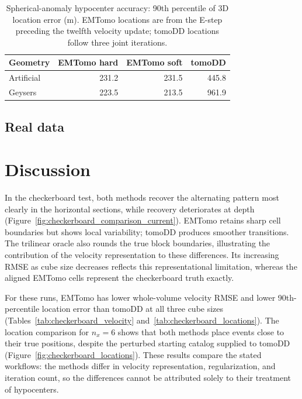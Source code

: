 \begin{table}[!htb]
\centering
\begin{singlespace}
\caption{Spherical-anomaly hypocenter accuracy: 90th percentile of 3D location error (m). EMTomo locations are from the E-step preceding the twelfth velocity update; tomoDD locations follow three joint iterations.}
\label{tab:spherical_locations}
\begin{tabular}{lrrr}
\toprule
Geometry & EMTomo hard & EMTomo soft & tomoDD \\
\midrule
Artificial & 231.2 & 231.5 & 445.8 \\
Geysers & 223.5 & 213.5 & 961.9 \\
\bottomrule
\end{tabular}
\end{singlespace}
\end{table}
\FloatBarrier

\subsection{Real data}
\label{subsec:geysers_results}

\section{Discussion}
\label{sec:discussion}

In the checkerboard test, both methods recover the alternating pattern most clearly in the horizontal sections, while recovery deteriorates at depth (Figure~\ref{fig:checkerboard_comparison_current}). EMTomo retains sharp cell boundaries but shows local variability; tomoDD produces smoother transitions. The trilinear oracle also rounds the true block boundaries, illustrating the contribution of the velocity representation to these differences. Its increasing RMSE as cube size decreases reflects this representational limitation, whereas the aligned EMTomo cells represent the checkerboard truth exactly.

For these runs, EMTomo has lower whole-volume velocity RMSE and lower 90th-percentile location error than tomoDD at all three cube sizes (Tables~\ref{tab:checkerboard_velocity} and~\ref{tab:checkerboard_locations}). The location comparison for $n_x=6$ shows that both methods place events close to their true positions, despite the perturbed starting catalog supplied to tomoDD (Figure~\ref{fig:checkerboard_locations}). These results compare the stated workflows: the methods differ in velocity representation, regularization, and iteration count, so the differences cannot be attributed solely to their treatment of hypocenters.
